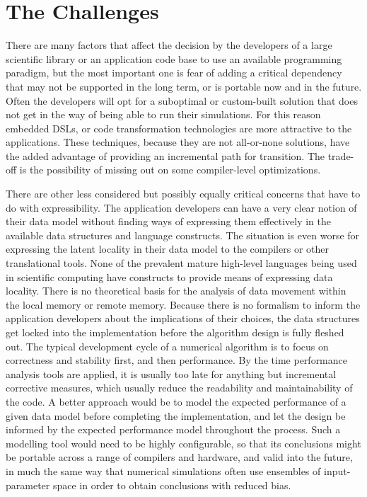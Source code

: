 \section{The Challenges}
There are many factors that affect the decision by the developers of a
large scientific library or an application code base to use an 
available programming paradigm, but the most important one is fear of
adding a critical dependency that may not be supported in the long
term, or is portable now and in the future. Often the developers
will opt for a suboptimal or custom-built
solution that does not get in the way of being able to run their
simulations. For this reason embedded DSLs, or code transformation
technologies are more attractive to the applications. These
techniques, because they are not all-or-none solutions, have the added
advantage of providing an incremental path for transition. The trade-off
is the possibility of missing out on some compiler-level optimizations.  

There are other less considered but possibly equally critical concerns
that have to do with expressibility. The application developers can
have a very clear notion of their data model without finding ways of
expressing them effectively in the available data structures and
language constructs. The situation is even worse for expressing the
latent locality in their data model to the compilers or other
translational tools. None of the prevalent mature high-level languages
being used in scientific computing have constructs to provide means of
expressing data locality. There is no theoretical basis for the
analysis of data movement within the local memory or remote
memory. Because there is no formalism to inform the application
developers about the implications of their choices, the data
structures get locked into the implementation before the algorithm
design is fully fleshed out.  The typical development cycle of a
numerical algorithm is to focus on correctness and stability first,
and then performance. By the time performance analysis tools are
applied, it is usually too late for anything but incremental
corrective measures, which usually reduce the readability and
maintainability of the code. A better approach would be to model the
expected performance of a given data model before completing the
implementation, and let the design be informed by the expected
performance model throughout the process. Such a modelling tool
would need to be highly configurable, so that its conclusions might
be portable across a range of compilers and hardware, and valid
into the future, in much the same way that numerical simulations
often use ensembles of input-parameter space in order to obtain
conclusions with reduced bias.

